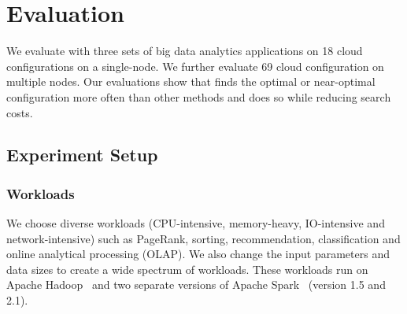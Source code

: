 \section{Evaluation}
\label{sec:evaluation}

We evaluate \scout with three sets of big data analytics
applications on 18 cloud configurations on a single-node.
We further evaluate 69 cloud configuration on multiple nodes.
Our evaluations show that \scout finds the optimal or near-optimal configuration more often than other methods
and does so while reducing search costs.

\subsection{Experiment Setup}
\label{sec:setup}

\subsubsection*{Workloads}
We choose diverse workloads (CPU-intensive, memory-heavy, IO-intensive and network-intensive) such as PageRank, sorting, recommendation, classification and online analytical processing (OLAP).
We also change the input parameters and data sizes to create
a wide spectrum of workloads. 
These workloads run on Apache Hadoop~\cite{hadoop} and two separate versions of Apache Spark~\cite{spark} (version 1.5 and 2.1). 

